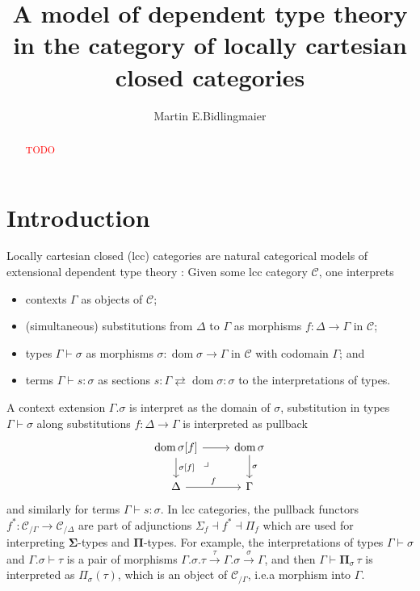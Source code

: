 \documentclass{article}
\newcommand{\todo}[1]{\textcolor{red}{#1}}
\begin{document}
\title{A model of dependent type theory in the category of locally cartesian closed categories}

\author{Martin E.\@ Bidlingmaier}

\maketitle

\begin{abstract}
  \todo{TODO}
\end{abstract}

\section{Introduction}

Locally cartesian closed (lcc) categories are natural categorical models of extensional dependent type theory \cite{lcc-categories-and-type-theory}:
Given some lcc category $\mathcal{C}$, one interprets
\begin{itemize}
  \item
    contexts $\Gamma$ as objects of $\mathcal{C}$;
  \item
    (simultaneous) substitutions from $\Delta$ to $\Gamma$ as morphisms $f : \Delta \rightarrow \Gamma$ in $\mathcal{C}$;
  \item
    types $\Gamma \vdash \sigma$ as morphisms $\sigma : \operatorname{dom} \sigma \rightarrow \Gamma$ in $\mathcal{C}$ with codomain $\Gamma$; and
  \item
    terms $\Gamma \vdash s : \sigma$ as sections $s : \Gamma \rightleftarrows \operatorname{dom} \sigma : \sigma$ to the interpretations of types.
\end{itemize}
A context extension $\Gamma.\sigma$ is interpret as the domain of $\sigma$, substitution in types $\Gamma \vdash \sigma$ along substitutions $f : \Delta \rightarrow \Gamma$ is interpreted as pullback
\begin{equation}
  \begin{tikzcd}
    \operatorname{dom} \sigma[f] \arrow[r] \arrow[d, "{\sigma[f]}"] \arrow[dr, phantom, near start, "\lrcorner"] & \operatorname{dom} \sigma \arrow[d, "\sigma"] \\
    \Delta \arrow[r, "f"] & \Gamma
  \end{tikzcd}
\end{equation}
and similarly for terms $\Gamma \vdash s : \sigma$.
In lcc categories, the pullback functors $f^* : \mathcal{C}_{/ \Gamma} \rightarrow \mathcal{C}_{/ \Delta}$ are part of adjunctions $\Sigma_f \dashv f^* \dashv \Pi_f$ which are used for interpreting $\mathbf{\Sigma}$-types and $\mathbf{\Pi}$-types.
For example, the interpretations of types $\Gamma \vdash \sigma$ and $\Gamma.\sigma \vdash \tau$ is a pair of morphisms $\Gamma.\sigma.\tau \xrightarrow{\tau} \Gamma.\sigma \xrightarrow{\sigma} \Gamma$, and then $\Gamma \vdash \mathbf{\Pi}_\sigma \, \tau$ is interpreted as $\Pi_\sigma(\tau)$, which is an object of $\mathcal{C}_{/ \Gamma}$, i.e.\@ a morphism into $\Gamma$.
\end{document}

